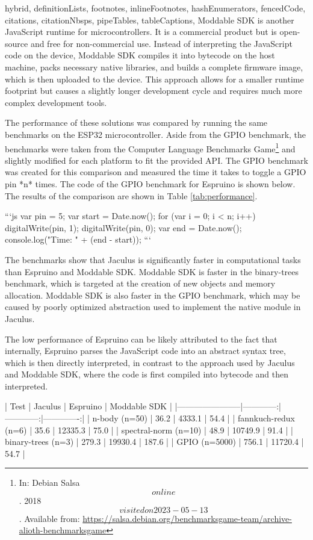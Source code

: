\begin{markdown*}{%
  hybrid,
  definitionLists,
  footnotes,
  inlineFootnotes,
  hashEnumerators,
  fencedCode,
  citations,
  citationNbsps,
  pipeTables,
  tableCaptions,
}
Moddable SDK is another JavaScript runtime for microcontrollers. It is a commercial product but is open-source and free for non-commercial use. Instead of interpreting the JavaScript code on the device, Moddable SDK compiles it into bytecode on the host machine, packs necessary native libraries, and builds a complete firmware image, which is then uploaded to the device. This approach allows for a smaller runtime footprint but causes a slightly longer development cycle and requires much more complex development tools.

The performance of these solutions was compared by running the same benchmarks on the ESP32 microcontroller. Aside from the GPIO benchmark, the benchmarks were taken from the Computer Language Benchmarks Game\footnote{In: Debian Salsa \[online\]. 2018 \[visited on 2023-05-13\]. Available from: \url{https://salsa.debian.org/benchmarksgame-team/archive-alioth-benchmarksgame}} and slightly modified for each platform to fit the provided API. The GPIO benchmark was created for this comparison and measured the time it takes to toggle a GPIO pin *n* times. The code of the GPIO benchmark for Espruino is shown below. The results of the comparison are shown in Table \ref{tab:performance}.

```js
var pin = 5;
var start = Date.now();
for (var i = 0; i < n; i++) {
    digitalWrite(pin, 1);
    digitalWrite(pin, 0);
}
var end = Date.now();
console.log("Time: " + (end - start));
```

The benchmarks show that Jaculus is significantly faster in computational tasks than Espruino and Moddable SDK. Moddable SDK is faster in the binary-trees benchmark, which is targeted at the creation of new objects and memory allocation. Moddable SDK is also faster in the GPIO benchmark, which may be caused by poorly optimized abstraction used to implement the native module in Jaculus.

The low performance of Espruino can be likely attributed to the fact that internally, Espruino parses the JavaScript code into an abstract syntax tree, which is then directly interpreted, in contrast to the approach used by Jaculus and Moddable SDK, where the code is first compiled into bytecode and then interpreted.


\begin{table}[ht]
  \centering

  | Test                  | Jaculus     | Espruino    | Moddable SDK |
  |-----------------------|------------:|------------:|-------------:|
  | n-body (n=50)         | 36.2        | 4333.1      | 54.4         |
  | fannkuch-redux (n=6)  | 35.6        | 12335.3     | 75.0         |
  | spectral-norm (n=10)  | 48.9        | 10749.9     | 91.4         |
  | binary-trees (n=3)    | 279.3       | 19930.4     | 187.6        |
  | GPIO (n=5000)         | 756.1       | 11720.4     | 54.7         |


\end{table}
\end{markdown*}

